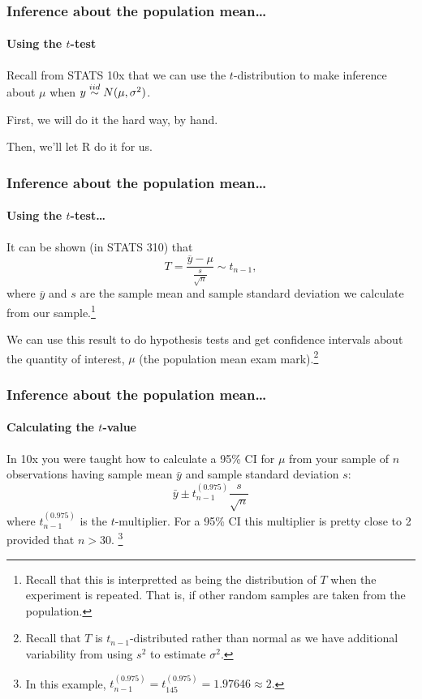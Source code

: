 \documentclass{beamer}\usepackage[]{graphicx}\usepackage[]{xcolor}
\begin{document}

\begin{frame}
\frametitle{Inference about the population mean\ldots}
\framesubtitle{Using the $t$-test}
Recall from STATS 10x that we can use the $t$-distribution to make inference about
$\mu$ when  $y \stackrel{iid}{\sim} N(\mu, \sigma^{2})$.

First, we will do it the hard way, by hand.

Then, we'll let R do it for us.
\end{frame}



\begin{frame}[fragile]
\frametitle{Inference about the population mean\ldots}
\framesubtitle{Using the $t$-test\ldots}
It can be shown (in STATS 310) that 
\[
T = \frac{\overline{y}-\mu}{\frac{s}{\sqrt{n}}} \sim t_{n-1},
\]
where $\overline{y}$ and $s$ are the sample mean and sample standard deviation we calculate from our sample.\footnote{Recall that this is interpretted as being the distribution of $T$ when the experiment is repeated. That is, if other random samples are taken from the population.}

We can use this result to do hypothesis tests and get confidence intervals about the quantity of interest, $\mu$ (the population mean exam mark).\footnote{Recall that $T$ is $t_{n-1}$-distributed rather than normal as we have additional variability from using $s^2$ to estimate $\sigma^2$.} 
\end{frame}



\begin{frame}[fragile]
\frametitle{Inference about the population mean\ldots}
\framesubtitle{Calculating the $t$-value} 

In 10x you were taught how to calculate a 95\%  CI for $\mu$ from your sample of $n$ observations having
sample mean $\bar{y}$ and sample standard deviation $s$:
\[
\bar{y}\pm t_{n-1}^{(0.975)}\frac{s}{\sqrt{n}}
\]
where $t_{n-1}^{(0.975)}$ is the $t$-multiplier. For a  95\% CI this multiplier is pretty close to 2 provided that $n>30$.
\footnote{ In this example, $t_{n-1}^{(0.975)}=t_{145}^{(0.975)}=1.97646\approx 2.$}
\end{frame}
\end{document}
